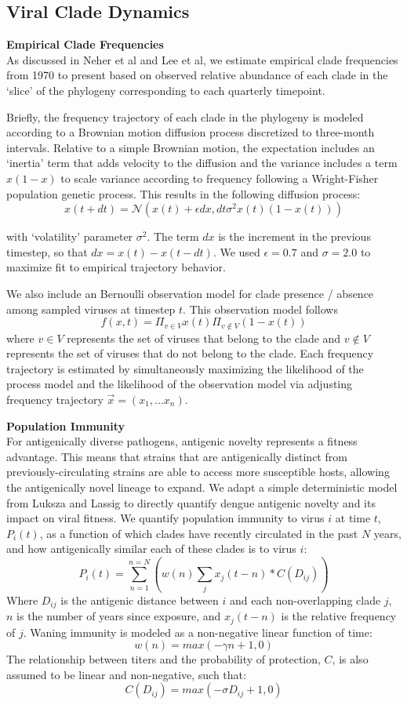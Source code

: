 \documentclass[11pt,oneside,letterpaper]{article}
\begin{document}
\subsection*{Viral Clade Dynamics}

\textbf{Empirical Clade Frequencies}\\
As discussed in Neher et al and Lee et al, we estimate empirical clade frequencies from 1970 to present based on observed relative abundance of each clade in the `slice' of the phylogeny corresponding to each quarterly timepoint.

Briefly, the frequency trajectory of each clade in the phylogeny is modeled according to a Brownian motion diffusion process discretized to three-month intervals.
Relative to a simple Brownian motion, the expectation includes an `inertia' term that adds velocity to the diffusion and the variance includes a term $x(1-x)$ to scale variance according to frequency following a Wright-Fisher population genetic process.
This results in the following diffusion process:
$$x(t+dt) = \mathcal{N}(x(t) + \epsilon dx, dt \sigma^2 x(t) (1-x(t)))$$

with `volatility' parameter $\sigma^2$.
The term $dx$ is the increment in the previous timestep, so that $dx = x(t) - x(t-dt)$.
We used $\epsilon = 0.7$ and $\sigma = 2.0$ to maximize fit to empirical trajectory behavior.

We also include an Bernoulli observation model for clade presence / absence among sampled viruses at timestep $t$.
This observation model follows
$$f(x,t) = \Pi_{v \in V} x(t) \Pi_{v \notin V} (1-x(t))$$
where $v \in V$ represents the set of viruses that belong to the clade and $v \notin V$ represents the set of viruses that do not belong to the clade.
Each frequency trajectory is estimated by simultaneously
maximizing the likelihood of the process model and the likelihood
of the observation model via adjusting frequency trajectory $\vec{x} = (x_1, ... x_n)$.

\textbf{Population Immunity}\\
For antigenically diverse pathogens, antigenic novelty represents a fitness advantage.
This means that strains that are antigenically distinct from previously-circulating strains are able to access more susceptible hosts, allowing the antigenically novel lineage to expand.
We adapt a simple deterministic model from Luksza and Lassig to directly quantify dengue antigenic novelty and its impact on viral fitness.
We quantify population immunity to virus $i$ at time $t$, $P_i(t)$, as a function of which clades have recently circulated in the past $N$ years, and how antigenically similar each of these clades is to virus $i$:
$$P_i(t) = \sum_{n=1}^{n=N} (w(n)  \sum_{j} x_j(t-n) * C( D_{ij}))$$
Where $D_{ij}$ is the antigenic distance between $i$ and each non-overlapping clade $j$, $n$ is the number of years since exposure, and $x_j(t-n)$ is the relative frequency of $j$.
Waning immunity is modeled as a non-negative linear function of time:
$$w(n) = max(-\gamma n + 1, 0)$$
The relationship between titers and the probability of protection, $C$, is also assumed to be linear and non-negative, such that:
$$C(D_{ij}) = max(-\sigma D_{ij} + 1, 0)$$
\end{document}
